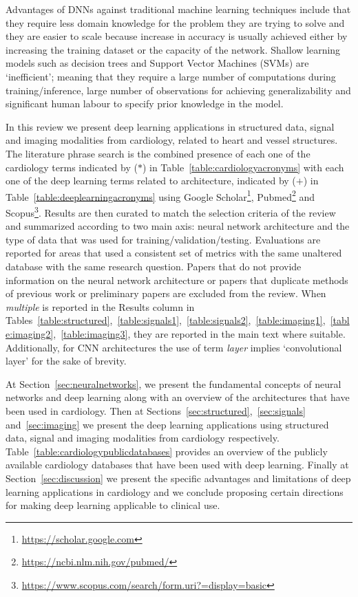 \documentclass[journal]{IEEEtran}
\begin{document}
Advantages of DNNs against traditional machine learning techniques include that they require less domain knowledge for the problem they are trying to solve and they are easier to scale because increase in accuracy is usually achieved either by increasing the training dataset or the capacity of the network.
Shallow learning models such as decision trees and Support Vector Machines (SVMs) are `inefficient'; meaning that they require a large number of computations during training/inference, large number of observations for achieving generalizability and significant human labour to specify prior knowledge in the model\cite{bengio2007scaling}.

In this review we present deep learning applications in structured data, signal and imaging modalities from cardiology, related to heart and vessel structures.
The literature phrase search is the combined presence of each one of the cardiology terms indicated by ($*$) in Table~\ref{table:cardiologyacronyms} with each one of the deep learning terms related to architecture, indicated by ($+$) in Table~\ref{table:deeplearningacronyms} using Google Scholar\footnote{\url{https://scholar.google.com}}, Pubmed\footnote{\url{https://ncbi.nlm.nih.gov/pubmed/}} and Scopus\footnote{\url{https://www.scopus.com/search/form.uri?=display=basic}}.
Results are then curated to match the selection criteria of the review and summarized according to two main axis: neural network architecture and the type of data that was used for training/validation/testing.
Evaluations are reported for areas that used a consistent set of metrics with the same unaltered database with the same research question.
Papers that do not provide information on the neural network architecture or papers that duplicate methods of previous work or preliminary papers are excluded from the review.
When \textit{multiple} is reported in the Results column in Tables~\ref{table:structured},~\ref{table:signals1},~\ref{table:signals2},~\ref{table:imaging1},~\ref{table:imaging2},~\ref{table:imaging3}, they are reported in the main text where suitable.
Additionally, for CNN architectures the use of term \textit{layer} implies `convolutional layer' for the sake of brevity.

At Section~\ref{sec:neuralnetworks}, we present the fundamental concepts of neural networks and deep learning along with an overview of the architectures that have been used in cardiology.
Then at Sections~\ref{sec:structured},~\ref{sec:signals} and~\ref{sec:imaging} we present the deep learning applications using structured data, signal and imaging modalities from cardiology respectively.
Table~\ref{table:cardiologypublicdatabases} provides an overview of the publicly available cardiology databases that have been used with deep learning.
Finally at Section~\ref{sec:discussion} we present the specific advantages and limitations of deep learning applications in cardiology and we conclude proposing certain directions for making deep learning applicable to clinical use.
\end{document}
